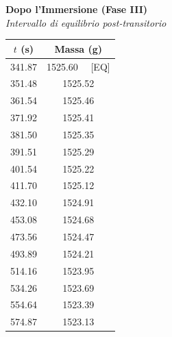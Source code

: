 \documentclass[a4paper,12pt]{article}
\begin{document}
\begin{minipage}[t]{0.58\textwidth}
    \centering
    \textbf{Dopo l'Immersione (Fase III)} \\
    \textit{Intervallo di equilibrio post-transitorio} \\
    \vspace{0.3cm}
    \begin{tabular}{cc}
        \hline
        $t$ (s) & Massa (g) \\ \hline
        341.87 & 1525.60 \ \ [EQ] \\
        351.48 & 1525.52 \\
        361.54 & 1525.46 \\
        371.92 & 1525.41 \\
        381.50 & 1525.35 \\
        391.51 & 1525.29 \\
        401.54 & 1525.22 \\
        411.70 & 1525.12 \\
        432.10 & 1524.91 \\
        453.08 & 1524.68 \\
        473.56 & 1524.47 \\
        493.89 & 1524.21 \\
        514.16 & 1523.95 \\
        534.26 & 1523.69 \\
        554.64 & 1523.39 \\
        574.87 & 1523.13 \\ \hline
    \end{tabular}
    \label{tab:dati_piombo}
\end{minipage}
\end{document}
